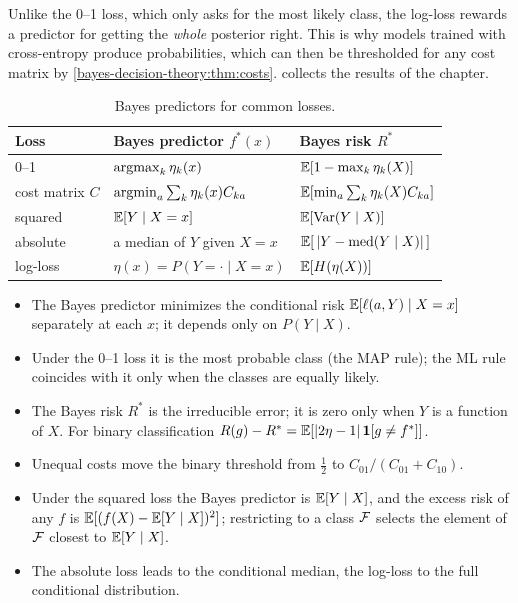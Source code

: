 \begin{notechapter}
Unlike the 0--1 loss, which only asks for the most likely class, the log-loss
rewards a predictor for getting the \emph{whole} posterior right. This is why
models trained with cross-entropy produce probabilities, which can then be
thresholded for any cost matrix by \cref{bayes-decision-theory:thm:costs}.
 collects the results of the chapter.

\begin{table}[ht]
\centering
\caption{Bayes predictors for common losses.}
\label{bayes-decision-theory:tab:summary}
\begin{tabular}{@{}lll@{}}
\toprule
Loss & Bayes predictor $f^*(x)$ & Bayes risk $R^*$ \\
\midrule
0--1 & $\operatorname*{argmax}_k \eta_k(x)$ & $\mathbb{E}[1 - \max_k \eta_k(X)]$ \\
cost matrix $C$ & $\operatorname*{argmin}_a \sum_k \eta_k(x) C_{ka}$ & $\mathbb{E}[\min_a \sum_k \eta_k(X) C_{ka}]$ \\
squared & $\mathbb{E}[Y\mid X=x]$ & $\mathbb{E}[\operatorname{Var}(Y\mid X)]$ \\
absolute & a median of $Y$ given $X = x$ & $\mathbb{E}[\,\left|Y - \mathrm{med}(Y\mid X)\right|\,]$ \\
log-loss & $\eta(x) = P(Y = \cdot \mid X = x)$ & $\mathbb{E}[H(\eta(X))]$ \\
\bottomrule
\end{tabular}
\end{table}

\begin{chaptersummary}
\begin{itemize}[nosep]
  \item The Bayes predictor minimizes the conditional risk
        $\mathbb{E}[\ell(a, Y)\mid X=x]$ separately at each $x$; it depends only on
        $P(Y\mid X)$.
  \item Under the 0--1 loss it is the most probable class (the MAP rule); the
        ML rule coincides with it only when the classes are equally likely.
  \item The Bayes risk $R^*$ is the irreducible error; it is zero only when
        $Y$ is a function of $X$. For binary classification
        $R(g) - R^* = \mathbb{E}[\left|2\eta-1\right|\mathbf{1}[g\neq f^*]]$.
  \item Unequal costs move the binary threshold from $\frac12$ to
        $C_{01}/(C_{01}+C_{10})$.
  \item Under the squared loss the Bayes predictor is $\mathbb{E}[Y\mid X]$, and the
        excess risk of any $f$ is $\mathbb{E}[(f(X) - \mathbb{E}[Y\mid X])^2]$; restricting to a
        class $\mathcal{F}$ selects the element of $\mathcal{F}$ closest to $\mathbb{E}[Y\mid X]$.
  \item The absolute loss leads to the conditional median, the log-loss to the
        full conditional distribution.
\end{itemize}
\end{chaptersummary}


\end{notechapter}
